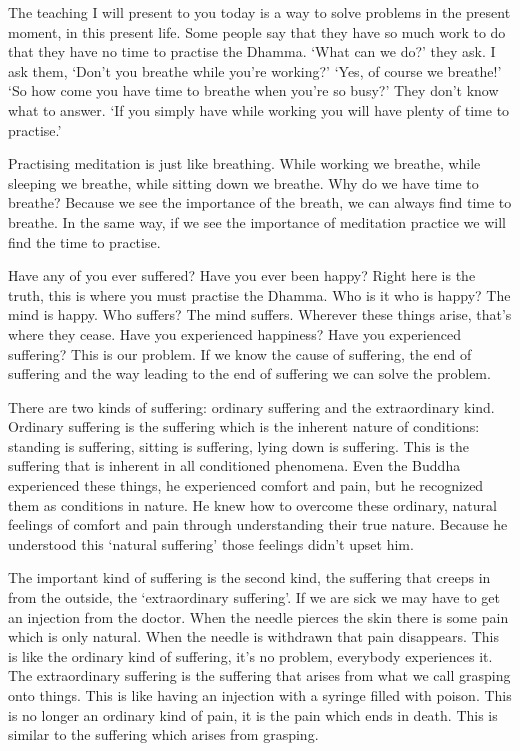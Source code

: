 The teaching I will present to you today is a way to solve problems in the present moment, in this present life. Some people say that they have so much work to do that they have no time to practise the Dhamma. `What can we do?' they ask. I ask them, `Don't you breathe while you're working?' `Yes, of course we breathe!' `So how come you have time to breathe when you're so busy?' They don't know what to answer. `If you simply have  while working you will have plenty of time to practise.' 

Practising meditation is just like breathing. While working we breathe, while sleeping we breathe, while sitting down we breathe. Why do we have time to breathe? Because we see the importance of the breath, we can always find time to breathe. In the same way, if we see the importance of meditation practice we will find the time to practise. 

Have any of you ever suffered? Have you ever been happy? Right here is the truth, this is where you must practise the Dhamma. Who is it who is happy? The mind is happy. Who suffers? The mind suffers. Wherever these things arise, that's where they cease. Have you experienced happiness? Have you experienced suffering? This is our problem. If we know  the cause of suffering, the end of suffering and the way leading to the end of suffering we can solve the problem. 

There are two kinds of suffering: ordinary suffering and the extraordinary kind. Ordinary suffering is the suffering which is the inherent nature of conditions: standing is suffering, sitting is suffering, lying down is suffering. This is the suffering that is inherent in all conditioned phenomena. Even the Buddha experienced these things, he experienced comfort and pain, but he recognized them as conditions in nature. He knew how to overcome these ordinary, natural feelings of comfort and pain through understanding their true nature. Because he understood this `natural suffering' those feelings didn't upset him. 

The important kind of suffering is the second kind, the suffering that creeps in from the outside, the `extraordinary suffering'. If we are sick we may have to get an injection from the doctor. When the needle pierces the skin there is some pain which is only natural. When the needle is withdrawn that pain disappears. This is like the ordinary kind of suffering, it's no problem, everybody experiences it. The extraordinary suffering is the suffering that arises from what we call  grasping onto things. This is like having an injection with a syringe filled with poison. This is no longer an ordinary kind of pain, it is the pain which ends in death. This is similar to the suffering which arises from grasping. 


